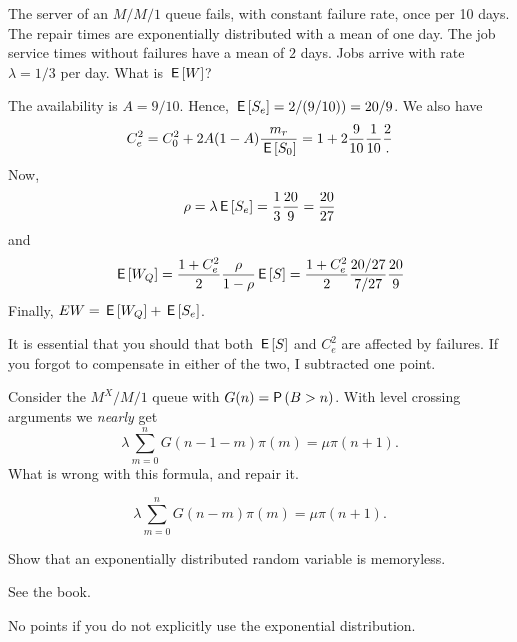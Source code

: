 \begin{exercise}[201704]{2}
  The server of an $M/M/1$ queue fails, with constant failure rate, once per 10 days.
  The repair times are exponentially distributed with a mean of one day.
  The job service times without failures have a mean of $2$ days.
  Jobs arrive with rate $\lambda=1/3$ per day.
  What is $\,\mathsf{E}\left[W\right]$?
\begin{solution}
  The availability is $A=9/10$. Hence, $\,\mathsf{E}\left[S_e\right] = 2/(9/10)) = 20/9$. We also have
\begin{equation*}
   C_e^2 = C_0^2 + 2A(1-A)\frac{m_r}{\,\mathsf{E}\left[S_0\right]} = 1 + 2\frac{9}{10}\frac1{10}\frac{2}.
 \end{equation*}
Now,
\begin{equation*}
  \rho = \lambda \,\mathsf{E}\left[S_e\right] = \frac13 \frac{20}9 = \frac{20}{27}
\end{equation*}
and
\begin{equation*}
  \,\mathsf{E}\left[W_Q\right] = \frac{1 + C_e^2}2 \frac{\rho}{1-\rho} \,\mathsf{E}\left[S\right] = \frac{1 + C_e^2}2 \frac{20/27}{7/27} \frac{20}9
\end{equation*}
Finally, $E W = \,\mathsf{E}\left[W_Q\right] + \,\mathsf{E}\left[S_e\right]$.

It is essential that you should that both $\,\mathsf{E}\left[S\right]$ and $C_e^2$ are affected by failures. If you forgot to compensate in either of the two, I subtracted one point. 
\end{solution}
\end{exercise}

\begin{exercise}[201704]{2}%
  Consider the $M^X/M/1$ queue with $G(n) = \P{B>n}$.
  With level crossing arguments we \emph{nearly} get
\begin{equation*}
\lambda  \sum_{m=0}^n G(n-1-m) \pi(m) = \mu \pi(n+1).
\end{equation*}
What is wrong with this formula, and repair it.
\begin{solution}
\begin{equation*}
\lambda  \sum_{m=0}^n G(n-m) \pi(m) = \mu \pi(n+1).
\end{equation*}
\end{solution}
\end{exercise}


\begin{exercise}[201706] Show that an  exponentially distributed random variable is memoryless.
\begin{solution}
  See the book.

No points if you do not explicitly use the exponential distribution.
\end{solution}
\end{exercise}


